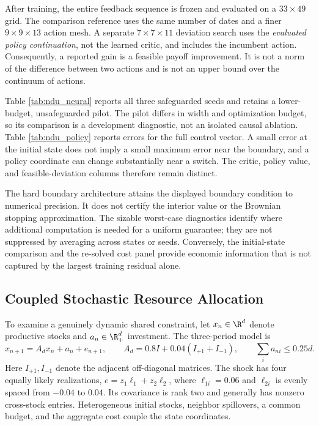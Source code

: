 After training, the entire feedback sequence is frozen and evaluated on a $33\times49$ grid. The comparison reference uses the same number of dates and a finer $9\times9\times13$ action mesh. A separate $7\times7\times11$ deviation search uses the \emph{evaluated policy continuation}, not the learned critic, and includes the incumbent action. Consequently, a reported gain is a feasible payoff improvement. It is not a norm of the difference between two actions and is not an upper bound over the continuum of actions.

Table \ref{tab:ndu_neural} reports all three safeguarded seeds and retains a lower-budget, unsafeguarded pilot. The pilot differs in width and optimization budget, so its comparison is a development diagnostic, not an isolated causal ablation. Table \ref{tab:ndu_policy} reports errors for the full control vector. A small error at the initial state does not imply a small maximum error near the boundary, and a policy coordinate can change substantially near a switch. The critic, policy value, and feasible-deviation columns therefore remain distinct.



The hard boundary architecture attains the displayed boundary condition to numerical precision. It does not certify the interior value or the Brownian stopping approximation. The sizable worst-case diagnostics identify where additional computation is needed for a uniform guarantee; they are not suppressed by averaging across states or seeds. Conversely, the initial-state comparison and the re-solved cost panel provide economic information that is not captured by the largest training residual alone.

\subsection{Coupled Stochastic Resource Allocation}
\label{sec:resource}
To examine a genuinely dynamic shared constraint, let $x_n\in\R^d$ denote productive stocks and $a_n\in\R_+^d$ investment. The three-period model is
\begin{equation}
 x_{n+1}=A_dx_n+a_n+e_{n+1},\qquad
 A_d=0.8I+0.04(I_{+1}+I_{-1}),\qquad
 \sum_i a_{ni}\leq0.25d.
 \label{eq:resource_state}
\end{equation}
Here $I_{+1},I_{-1}$ denote the adjacent off-diagonal matrices. The shock has four equally likely realizations,
$e=z_1\ell_1+z_2\ell_2$, where $\ell_{1i}=0.06$ and $\ell_{2i}$ is evenly spaced from $-0.04$ to $0.04$. Its covariance is rank two and generally has nonzero cross-stock entries. Heterogeneous initial stocks, neighbor spillovers, a common budget, and the aggregate cost couple the state coordinates.


